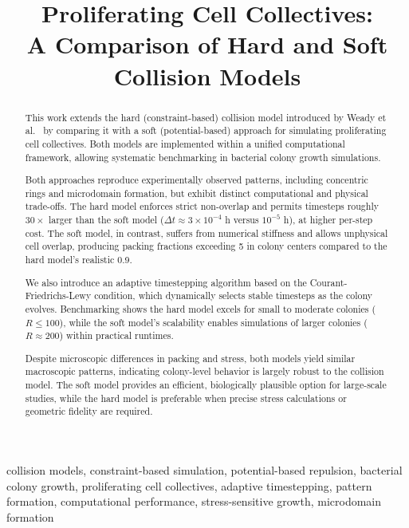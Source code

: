 \documentclass[conference]{IEEEtran}
\begin{document}
\title{Proliferating Cell Collectives: \\A Comparison of Hard and Soft Collision Models}

\author{
}

\maketitle

\begin{abstract}
    This work extends the hard (constraint-based) collision model introduced by Weady et al.~\cite{Weady2024} by comparing it with a soft (potential-based) approach for simulating proliferating cell collectives. Both models are implemented within a unified computational framework, allowing systematic benchmarking in bacterial colony growth simulations.

    Both approaches reproduce experimentally observed patterns, including concentric rings and microdomain formation, but exhibit distinct computational and physical trade-offs. The hard model enforces strict non-overlap and permits timesteps roughly $30\times$ larger than the soft model ($\Delta t \approx 3 \times 10^{-4}$ h versus $10^{-5}$ h), at higher per-step cost. The soft model, in contrast, suffers from numerical stiffness and allows unphysical cell overlap, producing packing fractions exceeding 5 in colony centers compared to the hard model's realistic 0.9.

    We also introduce an adaptive timestepping algorithm based on the Courant-Friedrichs-Lewy condition, which dynamically selects stable timesteps as the colony evolves. Benchmarking shows the hard model excels for small to moderate colonies ($R \leq 100$), while the soft model's scalability enables simulations of larger colonies ($R \approx 200$) within practical runtimes.

    Despite microscopic differences in packing and stress, both models yield similar macroscopic patterns, indicating colony-level behavior is largely robust to the collision model. The soft model provides an efficient, biologically plausible option for large-scale studies, while the hard model is preferable when precise stress calculations or geometric fidelity are required.
\end{abstract}

\begin{IEEEkeywords}
    collision models, constraint-based simulation, potential-based repulsion, bacterial colony growth, proliferating cell collectives, adaptive timestepping, pattern formation, computational performance, stress-sensitive growth, microdomain formation
\end{IEEEkeywords}
\end{document}
